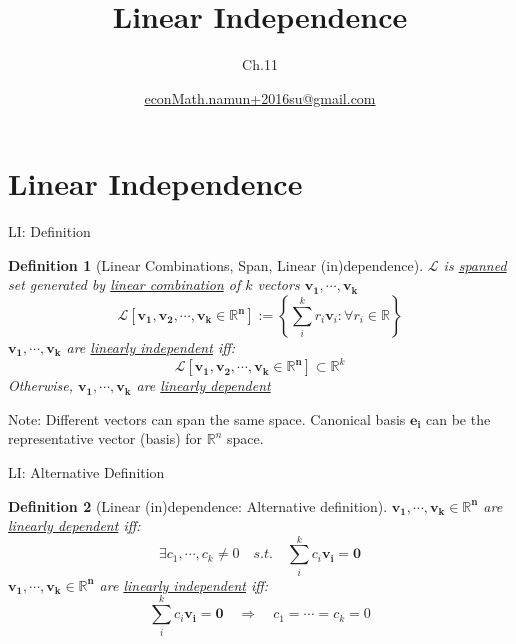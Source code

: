 \documentclass[a4paper,11pt]{article}
\author[조남운]{\url{econMath.namun+2016su@gmail.com}}
\title{Linear Independence}
\subtitle{Ch.11}
\newtheorem{defn}{Definition}
\begin{document}
	
\maketitle


\section{Linear Independence} %
\label{sec:linear_independence}
\begin{frame}[t]{LI: Definition}
	\begin{defn}
		[Linear Combinations, Span, Linear (in)dependence]
		$\mathcal{L}$ is \uline{spanned} set generated by \uline{linear combination} of $k$ vectors $\mathbf{v_1,\cdots,v_k}$
		\[
			\mathcal{L}[\mathbf{v_1,v_2,\cdots,v_k\in\mathbb{R}^n}]:=\left\{\sum_i^k r_i \mathbf{v}_i: \forall r_i\in \mathbb{R} \right\}
		\]
		$\mathbf{v_1,\cdots,v_k}$ are \uline{linearly independent} iff:
		\[
			\mathcal{L}[\mathbf{v_1,v_2,\cdots,v_k\in\mathbb{R}^n}]\subset \mathbb{R}^k
		\]
		Otherwise, $\mathbf{v_1,\cdots,v_k}$ are \uline{linearly dependent}
	\end{defn}
	Note: Different vectors can span the same space. Canonical basis $\mathbf{e_i}$ can be the representative vector (basis) for $\mathbb{R}^n$ space.
\end{frame}

\begin{frame}[t]{LI: Alternative Definition}
	\begin{defn}
		[Linear (in)dependence: Alternative definition]
		$\mathbf{v_1,\cdots,v_k\in\mathbb{R}^n}$ are \uline{linearly dependent} iff:
		\[
			\exists c_1,\cdots,c_k \neq 0 \quad s.t.\quad \sum_i^k c_i\mathbf{v_i} = \mathbf{0}
		\]
		$\mathbf{v_1,\cdots,v_k\in\mathbb{R}^n}$ are \uline{linearly independent} iff:
		\[
			\sum_i^k c_i\mathbf{v_i} = \mathbf{0} \quad\Rightarrow\quad c_1 = \cdots = c_k = 0
		\]
	\end{defn}
\end{frame}
\end{document}
